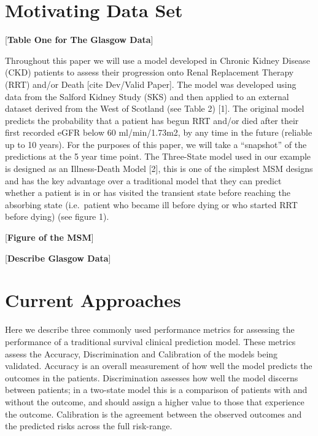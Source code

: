 \documentclass[12pt,PhD,twoside,openright]{muthesis}
\begin{document}
\hypertarget{motivating-data-set}{%
\section{Motivating Data Set}\label{motivating-data-set}}

{[}\textbf{Table One for The Glasgow Data}{]}

Throughout this paper we will use a model developed in Chronic Kidney Disease (CKD) patients to assess their progression onto Renal Replacement Therapy (RRT) and/or Death {[}cite Dev/Valid Paper{]}. The model was developed using data from the Salford Kidney Study (SKS) and then applied to an external dataset derived from the West of Scotland (see Table 2) {[}1{]}. The original model predicts the probability that a patient has begun RRT and/or died after their first recorded eGFR below 60 ml/min/1.73m2, by any time in the future (reliable up to 10 years). For the purposes of this paper, we will take a ``snapshot'' of the predictions at the 5 year time point.
The Three-State model used in our example is designed as an Illness-Death Model {[}2{]}, this is one of the simplest MSM designs and has the key advantage over a traditional model that they can predict whether a patient is in or has visited the transient state before reaching the absorbing state (i.e.~patient who became ill before dying or who started RRT before dying) (see figure 1).

{[}\textbf{Figure of the MSM}{]}

{[}\textbf{Describe Glasgow Data}{]}

\hypertarget{current-approaches}{%
\section{Current Approaches}\label{current-approaches}}

Here we describe three commonly used performance metrics for assessing the performance of a traditional survival clinical prediction model. These metrics assess the Accuracy, Discrimination and Calibration of the models being validated. Accuracy is an overall measurement of how well the model predicts the outcomes in the patients. Discrimination assesses how well the model discerns between patients; in a two-state model this is a comparison of patients with and without the outcome, and should assign a higher value to those that experience the outcome. Calibration is the agreement between the observed outcomes and the predicted risks across the full risk-range.
\end{document}
